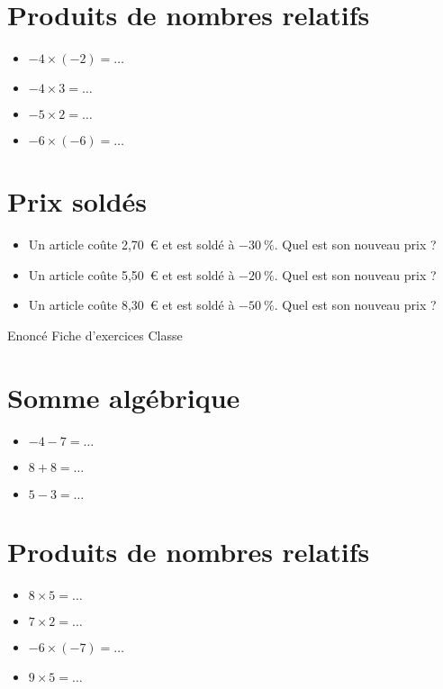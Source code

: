 \documentclass[a4paper,11pt,fleqn]{article}
\begin{document}
\section{Produits de nombres relatifs}
\begin{itemize}

  \item $-4\times(-2)=\ldots$
  \item $-4\times3=\ldots$
  \item $-5\times2=\ldots$
  \item $-6\times(-6)=\ldots$
\end{itemize}


\section{Prix soldés}
\begin{itemize}

  \item Un article coûte 2,70~€ et est soldé à $-30~\%$. Quel est son nouveau prix ?
  \item Un article coûte 5,50~€ et est soldé à $-20~\%$. Quel est son nouveau prix ?
  \item Un article coûte 8,30~€ et est soldé à $-50~\%$. Quel est son nouveau prix ?
\end{itemize}
\newpage
\setcounter{exo}{0}
\setcounter{section}{0}
{Enoncé} \hfill {\huge Fiche d'exercices } \hfill {Classe}

\section{Somme algébrique}
\begin{itemize}

  \item $-4 -7=\ldots$
  \item $8 +8=\ldots$
  \item $5 -3=\ldots$
\end{itemize}


\section{Produits de nombres relatifs}
\begin{itemize}

  \item $8\times5=\ldots$
  \item $7\times2=\ldots$
  \item $-6\times(-7)=\ldots$
  \item $9\times5=\ldots$
\end{itemize}
\end{document}
